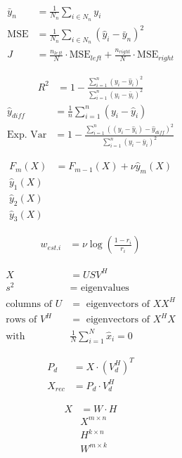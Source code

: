 \documentclass[USenglish,final,authoryear,12pt]{article}
\begin{document}
\begin{align*}
	\bar{y}_n &= \frac{1}{N_n}\sum_{i\in N_n}y_i\\
	\text{MSE} &= \frac{1}{N_n}\sum_{i\in N_n}(\hat{y}_i - \bar{y}_n)^2\\
	J &= \frac{n_{left}}{N}\cdot \text{MSE}_{left} + \frac{n_{right}}{N}\cdot \text{MSE}_{right}
\end{align*}

\begin{align*}
	R^2 &= 1 - \frac{\sum_{i=1}^{n}\left(y_i - \hat{y}_i\right)^2}{\sum_{i=1}^{n}\left(y_i - \bar{y}_i\right)^2}
\end{align*}
\begin{align*}
	\hat{y}_{diff} &= \frac{1}{n}\sum_{i=1}^{n}\left(y_i - \hat{y}_i\right)\\
	\text{Exp. Var} &= 1 - \frac{\sum_{i=1}^{n}\left((y_i - \hat{y}_i) - \hat{y}_{diff}\right)^2}{\sum_{i=1}^{n}\left(y_i - \bar{y}_i\right)^2}
\end{align*}

\begin{align*}
	F_m(X) &= F_{m-1}(X) + \nu \hat{y}_m(X)\\
	\hat{y}_1(X)&\\
	\hat{y}_2(X)&\\
	\hat{y}_3(X)&
\end{align*}

\begin{align*}
	w_{est. i} &= \nu \log\left(\frac{1-r_i}{r_i}\right)
\end{align*}

\begin{align*}
	X &= USV^H\\
	s^2&=\text{ eigenvalues}\\
	\text{columns of }U&=\text{ eigenvectors of }XX^H\\
	\text{rows of }V^H&=\text{ eigenvectors of }X^HX\\
	\text{with }&\frac{1}{N}\sum_{i=1}^{N}\hat{x}_i=0
\end{align*}

\begin{align*}
	P_d &= X \cdot \left(V_d^H\right)^T\\
	X_{rec} &= P_d \cdot V_d^H
\end{align*}

\begin{align*}
	X &= W\cdot H\\
	& X^{m \times n}\\
	& H^{k \times n}\\
	& W^{m \times k} 
\end{align*}
\end{document}
